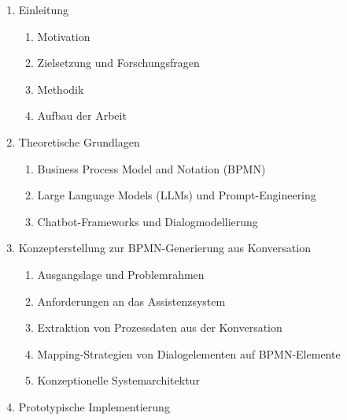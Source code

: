 \documentclass[a4paper,12pt]{scrreprt}
\begin{document}
\begin{enumerate}[label=\arabic*.]
    \item Einleitung
    \begin{enumerate}[label*=\arabic*.]
        \item Motivation
        \item Zielsetzung und Forschungsfragen
        \item Methodik
        \item Aufbau der Arbeit
    \end{enumerate}
    
    \item Theoretische Grundlagen
    \begin{enumerate}[label*=\arabic*.]
        \item Business Process Model and Notation (BPMN)
        \item Large Language Models (LLMs) und Prompt-Engineering
        \item Chatbot-Frameworks und Dialogmodellierung
    \end{enumerate}
    
    \item Konzepterstellung zur BPMN-Generierung aus Konversation
    \begin{enumerate}[label*=\arabic*]
        \item Ausgangslage und Problemrahmen
        \item Anforderungen an das Assistenzsystem
        \item Extraktion von Prozessdaten aus der Konversation
        \item Mapping-Strategien von Dialogelementen auf BPMN-Elemente
        \item Konzeptionelle Systemarchitektur
    \end{enumerate}
    
	\item Prototypische Implementierung
	\begin{enumerate}[label*=\arabic*.]
		

\end{enumerate}
\end{enumerate}
\end{document}
